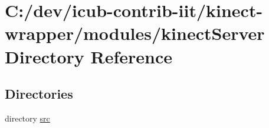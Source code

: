 \section{C\+:/dev/icub-\/contrib-\/iit/kinect-\/wrapper/modules/kinect\+Server Directory Reference}
\label{dir_65d72078f2cb6a873d9d899efb0a00ca}
\subsection*{Directories}
\begin{DoxyCompactItemize}
\item 
directory \hyperlink{dir_a1b31a03c5999012deeb52e88e48b55d}{src}
\end{DoxyCompactItemize}
